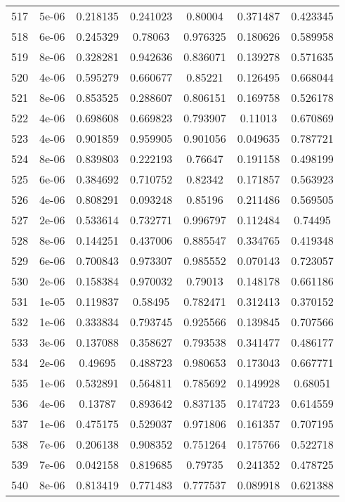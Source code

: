 \begin{table}
\begin{tabular*}{\linewidth}{c|c|c|c|c|c|c}
517 & 5e-06 & 0.218135 & 0.241023 & 0.80004 & 0.371487 & 0.423345\\
518 & 6e-06 & 0.245329 & 0.78063 & 0.976325 & 0.180626 & 0.589958\\
519 & 8e-06 & 0.328281 & 0.942636 & 0.836071 & 0.139278 & 0.571635\\
520 & 4e-06 & 0.595279 & 0.660677 & 0.85221 & 0.126495 & 0.668044\\
521 & 8e-06 & 0.853525 & 0.288607 & 0.806151 & 0.169758 & 0.526178\\
522 & 4e-06 & 0.698608 & 0.669823 & 0.793907 & 0.11013 & 0.670869\\
523 & 4e-06 & 0.901859 & 0.959905 & 0.901056 & 0.049635 & 0.787721\\
524 & 8e-06 & 0.839803 & 0.222193 & 0.76647 & 0.191158 & 0.498199\\
525 & 6e-06 & 0.384692 & 0.710752 & 0.82342 & 0.171857 & 0.563923\\
526 & 4e-06 & 0.808291 & 0.093248 & 0.85196 & 0.211486 & 0.569505\\
527 & 2e-06 & 0.533614 & 0.732771 & 0.996797 & 0.112484 & 0.74495\\
528 & 8e-06 & 0.144251 & 0.437006 & 0.885547 & 0.334765 & 0.419348\\
529 & 6e-06 & 0.700843 & 0.973307 & 0.985552 & 0.070143 & 0.723057\\
530 & 2e-06 & 0.158384 & 0.970032 & 0.79013 & 0.148178 & 0.661186\\
531 & 1e-05 & 0.119837 & 0.58495 & 0.782471 & 0.312413 & 0.370152\\
532 & 1e-06 & 0.333834 & 0.793745 & 0.925566 & 0.139845 & 0.707566\\
533 & 3e-06 & 0.137088 & 0.358627 & 0.793538 & 0.341477 & 0.486177\\
534 & 2e-06 & 0.49695 & 0.488723 & 0.980653 & 0.173043 & 0.667771\\
535 & 1e-06 & 0.532891 & 0.564811 & 0.785692 & 0.149928 & 0.68051\\
536 & 4e-06 & 0.13787 & 0.893642 & 0.837135 & 0.174723 & 0.614559\\
537 & 1e-06 & 0.475175 & 0.529037 & 0.971806 & 0.161357 & 0.707195\\
538 & 7e-06 & 0.206138 & 0.908352 & 0.751264 & 0.175766 & 0.522718\\
539 & 7e-06 & 0.042158 & 0.819685 & 0.79735 & 0.241352 & 0.478725\\
540 & 8e-06 & 0.813419 & 0.771483 & 0.777537 & 0.089918 & 0.621388\\
\end{tabular*}
\end{table}
